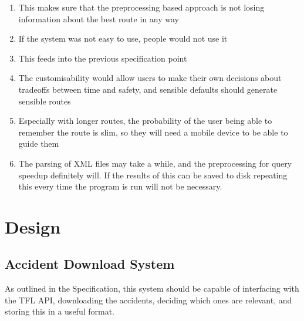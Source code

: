 \documentclass[11pt,twoside,a4paper]{report}
\begin{document}
\begin{enumerate}
\begin{enumerate}
        \item This makes sure that the preprocessing based approach is not losing information about the best route in any way
        \item If the system was not easy to use, people would not use it
        \item This feeds into the previous specification point
        \item The customisability would allow users to make their own decisions about tradeoffs between time and safety, and sensible defaults should generate sensible routes
        \item Especially with longer routes, the probability of the user being able to remember the route is slim, so they will need a mobile device to be able to guide them
        \item The parsing of XML files may take a while, and the preprocessing for query speedup definitely will. If the results of this can be saved to disk repeating this every time the program is run will not be necessary.
    \end{enumerate}
\end{enumerate}
\newpage
\chapter{Design}
\section{Accident Download System}
As outlined in the Specification, this system should be capable of interfacing with the TFL API, downloading the accidents, deciding which ones are relevant, and storing this in a useful format.
\end{document}
